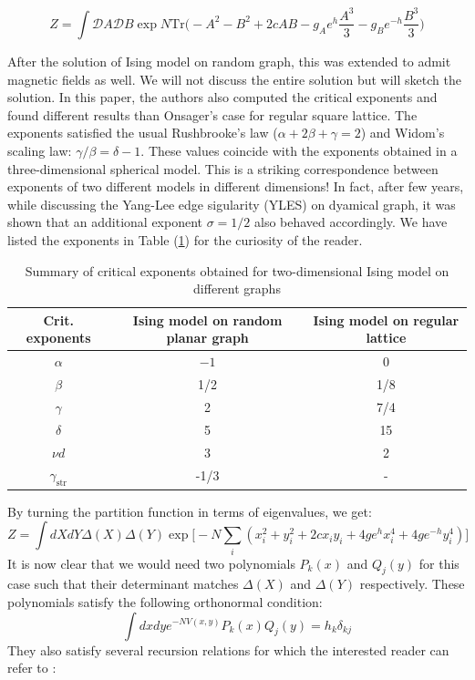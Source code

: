 \documentclass[11pt]{article}
\begin{document}
\begin{equation}
	\label{eq:RIsing1} 
	Z = \int \mathcal{D}A \mathcal{D}B \exp N \mbox{Tr} \Bigg(-A^2 -B^2 + 2c AB -g_{A}e^{h} \frac{A^3}{3} 
	- g_{B}e^{-h} \frac{B^3}{3}  \Bigg)
\end{equation}

After the solution of Ising model on random graph, this was extended to admit magnetic fields
\cite{Boulatov:1986sb} as well. We will not discuss the entire solution but will 
sketch the solution. In this paper, the authors also computed the critical exponents 
and found different results than Onsager's case for regular square lattice. 
The exponents satisfied the usual Rushbrooke's law ($\alpha + 2\beta+\gamma=2$) 
and Widom's scaling law: $\gamma/\beta = \delta -1$. 
These values coincide with the  exponents obtained in a three-dimensional spherical model. 
This is a striking correspondence between exponents of two different models in different dimensions! 
In fact, after few years, while discussing the Yang-Lee edge sigularity (YLES) on dyamical graph, 
it was shown that an additional exponent $\sigma =1/2$ 
also behaved accordingly. 
We have listed the exponents in Table (\ref{table:crit_exp}) for the curiosity of the reader.
\begin{table} 
	\begin{center} 
\begin{tabular}{|c|c|c|}
	\hline Crit. exponents & Ising model on random planar graph & Ising model on regular lattice \\
	\hline$\alpha$ & $-1$ & 0 \\
	$\beta$ & 1/2 & 1/8 \\
	$\gamma$ & 2 & 7/4 \\
	$\delta$ & 5 & 15 \\
	$\nu d$ & 3 & 2 \\
	$\gamma_{\text {str}}$ & -1/3 & - \\
	\hline
\end{tabular}
\end{center} 
	\caption{Summary of critical exponents obtained for two-dimensional Ising model on different graphs} 
	\label{table:crit_exp}
	\end{table} 
By turning the partition function in terms of eigenvalues, we get:
\begin{equation}
	Z = \int dX dY \Delta(X) \Delta(Y)
	 \exp \Big[-N \sum_{i} (x_{i}^2 + y_{i}^{2} +2c x_{i}y_{i} + 4ge^{h}x_{i}^{4} + 4ge^{-h}y_{i}^4) \Big]
	\end{equation}
It is now clear that we would need two polynomials $P_{k}(x)$ and $Q_{j}(y)$ for this case 
such that their determinant matches $\Delta(X)$ and $\Delta(Y)$ respectively. 
These polynomials satisfy the following orthonormal condition: 
\begin{equation}
\int dx dy e^{-N V(x,y)} P_{k}(x) Q_{j}(y) = h_{k} \delta_{kj}
\end{equation}
They also satisfy several recursion relations for which the interested reader can refer to 
\cite{Boulatov:1986sb}:
\end{document}
